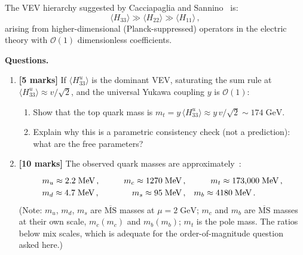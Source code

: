 \documentclass[11pt,a4paper]{article}
\begin{document}
The VEV hierarchy suggested by Cacciapaglia and
Sannino~\cite{CacciapagliaSannino2024} is:
\begin{equation}\label{eq:VEV-hierarchy}
  \langle H_{33} \rangle \gg \langle H_{22} \rangle
  \gg \langle H_{11} \rangle\,,
\end{equation}
arising from higher-dimensional (Planck-suppressed) operators in the
electric theory with $\mathcal{O}(1)$ dimensionless coefficients.

\medskip

\noindent\textbf{Questions.}
\begin{enumerate}[label=(\alph*)]

  \item \textbf{[5 marks]}
    If $\langle H_{33}^u \rangle$ is the dominant VEV, saturating the
    sum rule at $\langle H_{33}^u \rangle \approx v/\sqrt{2}$, and the
    universal Yukawa coupling $y$ is $\mathcal{O}(1)$:
    \begin{enumerate}[label=(\roman*)]
      \item Show that the top quark mass is
        $m_t = y\,\langle H_{33}^u \rangle \approx y\,v/\sqrt{2}
        \sim 174\;\text{GeV}$.
      \item Explain why this is a parametric consistency check
        (not a prediction): what are the free parameters?
    \end{enumerate}

  \item \textbf{[10 marks]}
    The observed quark masses are approximately~\cite{PDG2024}:
    \begin{equation}\label{eq:quark-masses}
    \renewcommand{\arraystretch}{1.2}
    \begin{array}{lrl}
      m_u \approx 2.2\;\text{MeV}\,, & \qquad
      m_c \approx 1270\;\text{MeV}\,, & \qquad
      m_t \approx 173{,}000\;\text{MeV}\,, \\
      m_d \approx 4.7\;\text{MeV}\,, &
      m_s \approx 95\;\text{MeV}\,, &
      m_b \approx 4180\;\text{MeV}\,.
    \end{array}
    \end{equation}
    (Note: $m_u$, $m_d$, $m_s$ are $\overline{\text{MS}}$ masses at
    $\mu = 2\;\text{GeV}$; $m_c$ and $m_b$ are $\overline{\text{MS}}$
    masses at their own scale, $m_c(m_c)$ and $m_b(m_b)$; $m_t$ is the
    pole mass.  The ratios below mix scales, which is adequate for the
    order-of-magnitude question asked here.)


\end{enumerate}
\end{document}
